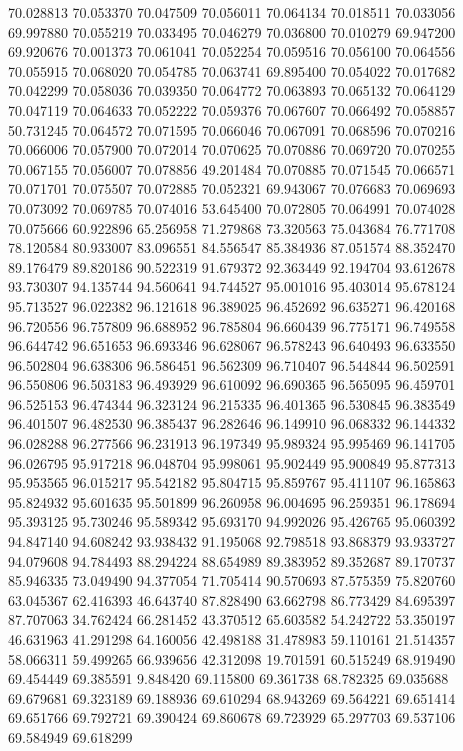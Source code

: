 70.028813
70.053370
70.047509
70.056011
70.064134
70.018511
70.033056
69.997880
70.055219
70.033495
70.046279
70.036800
70.010279
69.947200
69.920676
70.001373
70.061041
70.052254
70.059516
70.056100
70.064556
70.055915
70.068020
70.054785
70.063741
69.895400
70.054022
70.017682
70.042299
70.058036
70.039350
70.064772
70.063893
70.065132
70.064129
70.047119
70.064633
70.052222
70.059376
70.067607
70.066492
70.058857
50.731245
70.064572
70.071595
70.066046
70.067091
70.068596
70.070216
70.066006
70.057900
70.072014
70.070625
70.070886
70.069720
70.070255
70.067155
70.056007
70.078856
49.201484
70.070885
70.071545
70.066571
70.071701
70.075507
70.072885
70.052321
69.943067
70.076683
70.069693
70.073092
70.069785
70.074016
53.645400
70.072805
70.064991
70.074028
70.075666
60.922896
65.256958
71.279868
73.320563
75.043684
76.771708
78.120584
80.933007
83.096551
84.556547
85.384936
87.051574
88.352470
89.176479
89.820186
90.522319
91.679372
92.363449
92.194704
93.612678
93.730307
94.135744
94.560641
94.744527
95.001016
95.403014
95.678124
95.713527
96.022382
96.121618
96.389025
96.452692
96.635271
96.420168
96.720556
96.757809
96.688952
96.785804
96.660439
96.775171
96.749558
96.644742
96.651653
96.693346
96.628067
96.578243
96.640493
96.633550
96.502804
96.638306
96.586451
96.562309
96.710407
96.544844
96.502591
96.550806
96.503183
96.493929
96.610092
96.690365
96.565095
96.459701
96.525153
96.474344
96.323124
96.215335
96.401365
96.530845
96.383549
96.401507
96.482530
96.385437
96.282646
96.149910
96.068332
96.144332
96.028288
96.277566
96.231913
96.197349
95.989324
95.995469
96.141705
96.026795
95.917218
96.048704
95.998061
95.902449
95.900849
95.877313
95.953565
96.015217
95.542182
95.804715
95.859767
95.411107
96.165863
95.824932
95.601635
95.501899
96.260958
96.004695
96.259351
96.178694
95.393125
95.730246
95.589342
95.693170
94.992026
95.426765
95.060392
94.847140
94.608242
93.938432
91.195068
92.798518
93.868379
93.933727
94.079608
94.784493
88.294224
88.654989
89.383952
89.352687
89.170737
85.946335
73.049490
94.377054
71.705414
90.570693
87.575359
75.820760
63.045367
62.416393
46.643740
87.828490
63.662798
86.773429
84.695397
87.707063
34.762424
66.281452
43.370512
65.603582
54.242722
53.350197
46.631963
41.291298
64.160056
42.498188
31.478983
59.110161
21.514357
58.066311
59.499265
66.939656
42.312098
19.701591
60.515249
68.919490
69.454449
69.385591
9.848420
69.115800
69.361738
68.782325
69.035688
69.679681
69.323189
69.188936
69.610294
68.943269
69.564221
69.651414
69.651766
69.792721
69.390424
69.860678
69.723929
65.297703
69.537106
69.584949
69.618299
